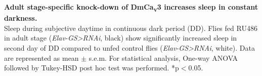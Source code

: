 \label{fig:S}
\textbf{Adult stage-specific knock-down of DmCa\textsubscript{v}3 increases sleep in constant darkness.}
\\
Sleep during subjective daytime in continuous dark period (DD). 
Flies fed RU486 in adult stage (\emph{Elav-GS\textgreater{}RNAi}, black) show significantly increased sleep in second day of DD compared to unfed control flies (\emph{Elav-GS\textgreater{}RNAi}, white).
Data are represented as mean $\pm$ s.e.m.
For statistical analysis, One-way ANOVA followed by Tukey-HSD post hoc test was performed.
*p$<$0.05.
  


  
  
  
  
  
  